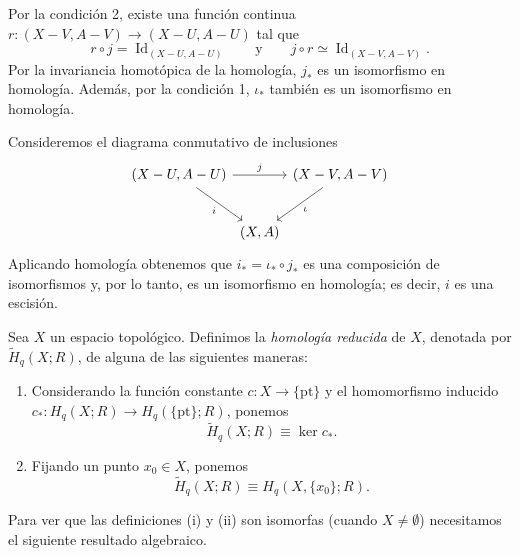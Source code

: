 \begin{dem}
Por la condición 2, existe una función continua $r \colon (X - V, A - V) \to (X - U, A - U)$ tal que
\[
r \circ j = \operatorname{Id}_{(X - U, A - U)}
\qquad \text{y} \qquad
j \circ r \simeq \operatorname{Id}_{(X - V, A - V)}.
\]
Por la invariancia homotópica de la homología, $j_*$ es un isomorfismo en homología. Además, por la condición 1, $\iota_*$ también es un isomorfismo en homología.

Consideremos el diagrama conmutativo de inclusiones
\[
\begin{tikzcd}[column sep=0.1em, row sep=2.4em]
(X - U, A - U) \arrow[rr, "j"] \arrow[dr, "i"'] & & (X - V, A - V) \arrow[dl, "\iota"] \\
& (X, A) &
\end{tikzcd}
\]
Aplicando homología obtenemos que $i_* = \iota_* \circ j_*$ es una composición de isomorfismos y, por lo tanto, es un isomorfismo en homología; es decir, $i$ es una escisión.
\end{dem}
\begin{definicion}
Sea $X$ un espacio topológico. Definimos la \textit{homología reducida} de $X$, denotada por $\widetilde{H}_q(X; R)$, de alguna de las siguientes maneras:
\begin{enumerate}
    \item[(i)] Considerando la función constante $c \colon X \to \{\mathrm{pt}\}$ y el homomorfismo inducido $c_* \colon H_q(X; R) \to H_q(\{\mathrm{pt}\}; R)$, ponemos
    \[
    \widetilde{H}_q(X; R) \equiv \ker c_*.
    \]
    \item[(ii)] Fijando un punto $x_0 \in X$, ponemos
    \[
    \widetilde{H}_q(X; R) \equiv H_q(X, \{x_0\}; R).
    \]
\end{enumerate}
\end{definicion}

Para ver que las definiciones (i) y (ii) son isomorfas (cuando $X \neq \emptyset$) necesitamos el siguiente resultado algebraico.

